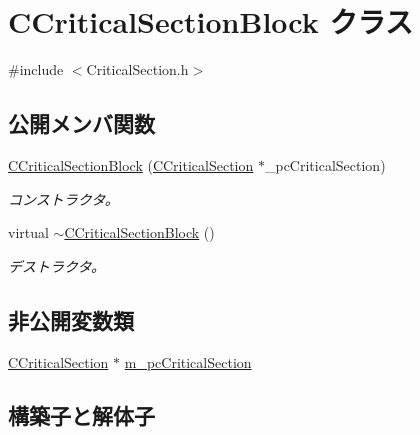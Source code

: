 \hypertarget{class_c_critical_section_block}{}\section{C\+Critical\+Section\+Block クラス}
\label{class_c_critical_section_block}


{\ttfamily \#include $<$Critical\+Section.\+h$>$}

\subsection*{公開メンバ関数}
\begin{DoxyCompactItemize}
\item 
\hyperlink{class_c_critical_section_block_a295a4d00010754caa3c188859869e157}{C\+Critical\+Section\+Block} (\hyperlink{class_c_critical_section}{C\+Critical\+Section} $\ast$\+\_\+pc\+Critical\+Section)
\begin{DoxyCompactList}\small\item\em コンストラクタ。 \end{DoxyCompactList}\item 
virtual \hyperlink{class_c_critical_section_block_a006b2ae6888c906d95fead637992331c}{$\sim$\+C\+Critical\+Section\+Block} ()
\begin{DoxyCompactList}\small\item\em デストラクタ。 \end{DoxyCompactList}\end{DoxyCompactItemize}
\subsection*{非公開変数類}
\begin{DoxyCompactItemize}
\item 
\hyperlink{class_c_critical_section}{C\+Critical\+Section} $\ast$ \hyperlink{class_c_critical_section_block_a85e6abc3f5091afdc7f8127737885974}{m\+\_\+pc\+Critical\+Section}
\end{DoxyCompactItemize}


\subsection{構築子と解体子}
\hypertarget{class_c_critical_section_block_a295a4d00010754caa3c188859869e157}{}
